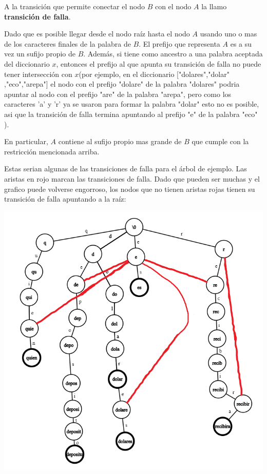 \documentclass{article}
\begin{document}
A la transición que permite conectar el nodo $B$ con el nodo $A$ la llamo \textbf{transición de falla}.

Dado que es posible llegar desde el nodo raíz hasta el nodo $A$ usando uno o mas de los caracteres finales de la palabra de $B$. El prefijo que representa $A$ es a su vez
un sufijo propio de $B$. Además, si tiene como ancestro a una palabra aceptada del diccionario $x$, entonces el prefijo al que apunta
su transición de falla no puede tener intersección con $x$(por ejemplo, en el diccionario ["dolares","dolar"
,"eco","arepa"] el nodo con el prefijo "dolare" de la palabra "dolares" podria
apuntar al nodo con el prefijo "are" de la palabra "arepa", pero como los caracteres 'a' y 'r' ya se
usaron para formar la palabra "dolar" esto no es posible, asi que la transición de falla termina apuntando
al prefijo "e" de la palabra "eco" ).

En particular, $A$ contiene al sufijo propio mas grande de $B$ que cumple con la restricción mencionada arriba.

Estas serian algunas de las transiciones de falla para el árbol de ejemplo. Las aristas en rojo marcan las transiciones de falla. Dado que pueden ser muchas y el grafico
puede volverse engorroso, los nodos que no tienen aristas rojas tienen su transición de falla apuntando a la raíz:

\begin{center}
\includegraphics[scale=0.4]{Imagenes/trie1_transiciones_falla.png}
\end{center}
\end{document}
